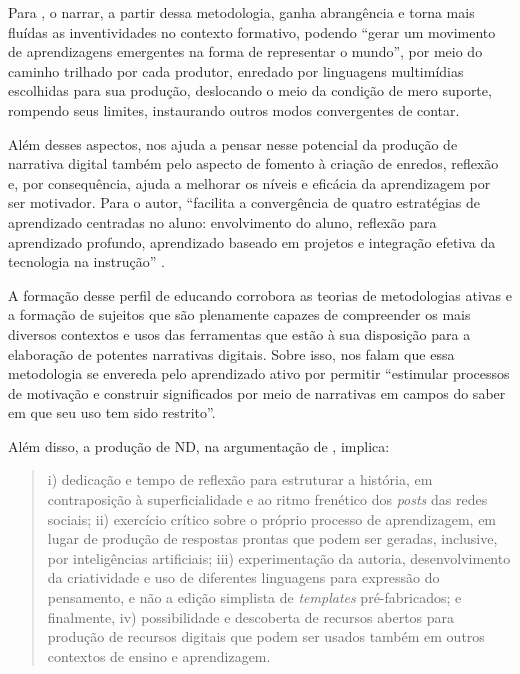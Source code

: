 \documentclass[portuguese]{textolivre}
\begin{document}
Para \textcite[p.~334]{moura2023narrativa}, o narrar, a partir dessa metodologia, ganha abrangência e torna mais fluídas as inventividades no contexto formativo, podendo “gerar um movimento de aprendizagens emergentes na forma de representar o mundo”, por meio do caminho trilhado por cada produtor, enredado por linguagens multimídias escolhidas para sua produção, deslocando o meio da condição de mero suporte, rompendo seus limites, instaurando outros modos convergentes de contar.

Além desses aspectos, \textcite{barrett2019storytelling} nos ajuda a pensar nesse potencial da produção de narrativa digital também pelo aspecto de fomento à criação de enredos, reflexão e, por consequência, ajuda a melhorar os níveis e eficácia da aprendizagem por ser motivador. Para o autor, “facilita a convergência de quatro estratégias de aprendizado centradas no aluno: envolvimento do aluno, reflexão para aprendizado profundo, aprendizado baseado em projetos e integração efetiva da tecnologia na instrução” \cite[p.~37]{barrett2019storytelling}.

A formação desse perfil de educando corrobora as teorias de metodologias ativas e a formação de sujeitos que são plenamente capazes de compreender os mais diversos contextos e usos das ferramentas que estão à sua disposição para a elaboração de potentes narrativas digitais. Sobre isso, \textcite[p.~223]{valenca2019storytelling} nos falam que essa metodologia se envereda pelo aprendizado ativo por permitir “estimular processos de motivação e construir significados por meio de narrativas em campos do saber em que seu uso tem sido restrito”.

Além disso, a produção de ND, na argumentação de \textcite[p.~51]{rodrigues2023para}, implica:
\begin{quote}
    i) dedicação e tempo de reflexão para estruturar a história, em contraposição à superficialidade e ao ritmo frenético dos \textit{posts} das redes sociais; ii) exercício crítico sobre o próprio processo de aprendizagem, em lugar de produção de respostas prontas que podem ser geradas, inclusive, por inteligências artificiais; iii) experimentação da autoria, desenvolvimento da criatividade e uso de diferentes linguagens para expressão do pensamento, e não a edição simplista de \textit{templates} pré-fabricados; e finalmente, iv) possibilidade e descoberta de recursos abertos para  produção de recursos digitais que podem ser usados também em outros contextos de ensino e aprendizagem.
\end{quote}
 
\end{document}
